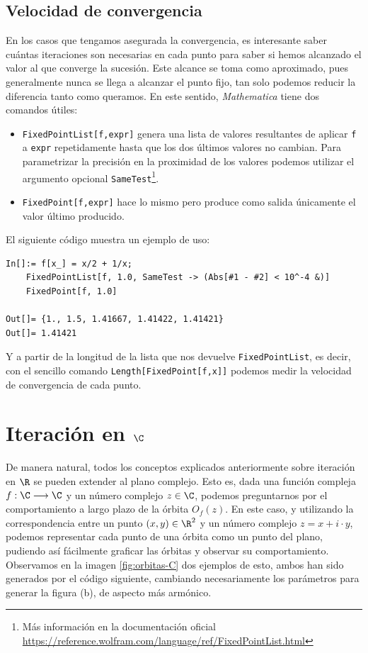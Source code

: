 \subsection{Velocidad de convergencia}

En los casos que tengamos asegurada la convergencia, es interesante saber cuántas iteraciones son necesarias en cada punto para saber si hemos alcanzado el valor al que converge la sucesión. Este alcance se toma como aproximado, pues generalmente nunca se llega a alcanzar el punto fijo, tan solo podemos reducir la diferencia tanto como queramos. En este sentido, \textit{Mathematica} tiene dos comandos útiles:

\begin{itemize}
    \item \verb|FixedPointList[f,expr]| genera una lista de valores resultantes de aplicar \verb|f| a \verb|expr| repetidamente hasta que los dos últimos valores no cambian. Para parametrizar la precisión en la proximidad de los valores podemos utilizar el argumento opcional \verb|SameTest|\footnote{Más información en la documentación oficial \url{https://reference.wolfram.com/language/ref/FixedPointList.html}}.
    \item \verb|FixedPoint[f,expr]| hace lo mismo pero produce como salida únicamente el valor último producido.
\end{itemize}

El siguiente código muestra un ejemplo de uso:

\begin{verbatim}
In[]:= f[x_] = x/2 + 1/x;
    FixedPointList[f, 1.0, SameTest -> (Abs[#1 - #2] < 10^-4 &)]
    FixedPoint[f, 1.0]

Out[]= {1., 1.5, 1.41667, 1.41422, 1.41421}
Out[]= 1.41421
\end{verbatim}

Y a partir de la longitud de la lista que nos devuelve \verb|FixedPointList|, es decir, con el sencillo comando \verb|Length[FixedPoint[f,x]]| podemos medir la velocidad de convergencia de cada punto.

\section{Iteración en $\C$}

De manera natural, todos los conceptos explicados anteriormente sobre iteración en $\R$ se pueden extender al plano complejo. Esto es, dada una función compleja $f:\C\longrightarrow\C$ y un número complejo $z\in\C$, podemos preguntarnos por el comportamiento a largo plazo de la órbita $O_f(z)$. En este caso, y utilizando la correspondencia entre un punto $(x,y)\in\R^2$ y un número complejo $z=x+i\cdot y$, podemos representar cada punto de una órbita como un punto del plano, pudiendo así fácilmente graficar las órbitas y observar su comportamiento. Observamos en la imagen \ref{fig:orbitas-C} dos ejemplos de esto, ambos han sido generados por el código siguiente, cambiando necesariamente los parámetros para generar la figura (b), de aspecto más armónico.

